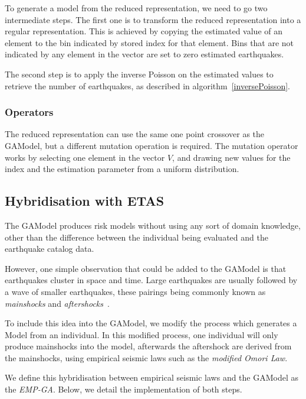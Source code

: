 To generate a model from the reduced representation, we need to go two
intermediate steps. The first one is to transform the reduced
representation into a regular representation. This is achieved by
copying the estimated value of an element to the bin indicated by
stored index for that element. Bins that are not indicated by any
element in the vector are set to zero estimated earthquakes.

The second step is to apply the inverse Poisson on the estimated
values to retrieve the number of earthquakes, as described in
algorithm~\ref{inversePoisson}.

\subsubsection*{Operators}

The reduced representation can use the same one point crossover as the
GAModel, but a different mutation operation is required. The mutation
operator works by selecting one element in the vector $V$, and drawing
new values for the index and the estimation parameter from a uniform
distribution.


\subsection{Hybridisation with ETAS}

The GAModel produces risk models without using any sort of domain
knowledge, other than the difference between the individual being
evaluated and the earthquake catalog data.

However, one simple observation that could be added to the GAModel is
that earthquakes cluster in space and time. Large earthquakes are
usually followed by a wave of smaller earthquakes, these pairings
being commonly known as \emph{mainshocks} and
\emph{aftershocks}~\cite{schorlemmer2010first}.

To include this idea into the GAModel, we modify the process which
generates a Model from an individual. In this modified process, one
individual will only produce mainshocks into the model, afterwards the
aftershock are derived from the mainshocks, using empirical seismic laws
such as the \emph{modified Omori Law}.

We define this hybridisation between empirical seismic laws and the
GAModel as the \emph{EMP-GA}. Below, we detail the implementation of
both steps.

